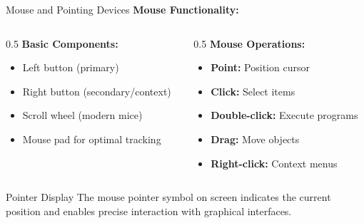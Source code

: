 \documentclass[aspectratio=169]{beamer}
\begin{document}
\begin{frame}{Mouse and Pointing Devices}
    \textbf{Mouse Functionality:}
    
    \begin{columns}
        \begin{column}{0.5\textwidth}
            \textbf{Basic Components:}
            \begin{itemize}
                \item Left button (primary)
                \item Right button (secondary/context)
                \item Scroll wheel (modern mice)
                \item Mouse pad for optimal tracking
            \end{itemize}
            
        \end{column}
        \begin{column}{0.5\textwidth}
              \textbf{Mouse Operations:}
            \begin{itemize}
                \item \textbf{Point:} Position cursor
                \item \textbf{Click:} Select items
                \item \textbf{Double-click:} Execute programs
                \item \textbf{Drag:} Move objects
                \item \textbf{Right-click:} Context menus
            \end{itemize} 
        \end{column}
    \end{columns}
    
       \begin{block}{Pointer Display}
        The mouse pointer symbol on screen indicates the current position and enables precise interaction with graphical interfaces.
    \end{block}
\end{frame}
\end{document}
